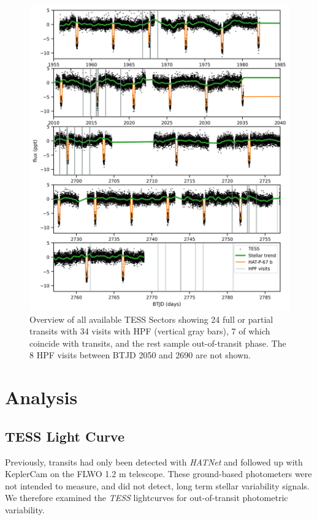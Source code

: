 \documentclass[twocolumn]{aastex631}
\newcommand{\hatp}{\object{HAT-P-67}}
\begin{document}
\begin{figure}
    \centering
    \includegraphics[width=0.7\linewidth]{figures/TESS_HAT-P-67b_overview.png}
    \caption{Overview of all available TESS Sectors showing 24 full or partial transits with 34 visits with HPF (vertical gray bars), 7 of which coincide with transits, and the rest sample out-of-transit phase.  The 8 HPF visits between BTJD 2050 and 2690 are not shown.}
    \label{fig:TESSoverview}
\end{figure}


\section{Analysis}

\subsection{TESS Light Curve}
Previously, \hatp transits had only been detected with \emph{HATNet} \citep{2004PASP..116..266B} and followed up with KeplerCam on the FLWO 1.2 m telescope. These ground-based photometers were not intended to measure, and did not detect, long term stellar variability signals.  We therefore examined the \emph{TESS} lightcurves for out-of-transit photometric variability.
\end{document}
